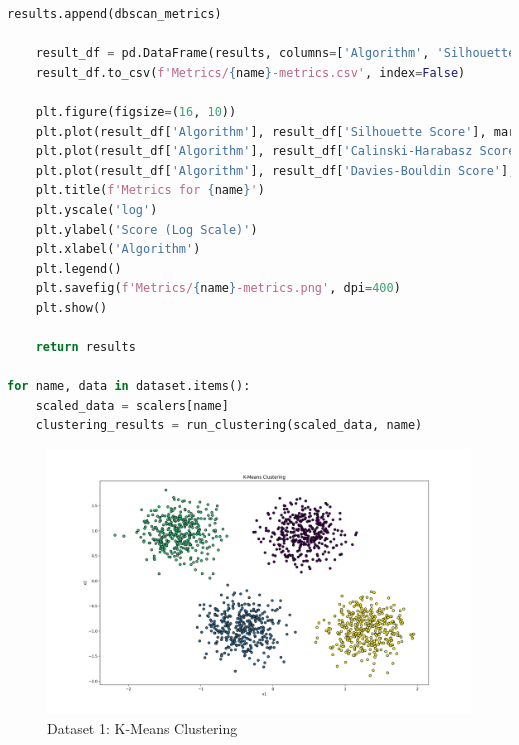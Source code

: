 \begin{lstlisting}[language=Python, caption=Code to Cluster Datasets and generate Metrics]
    results.append(dbscan_metrics)

    result_df = pd.DataFrame(results, columns=['Algorithm', 'Silhouette Score', 'Calinski-Harabasz Score', 'Davies-Bouldin Score'])
    result_df.to_csv(f'Metrics/{name}-metrics.csv', index=False)

    plt.figure(figsize=(16, 10))
    plt.plot(result_df['Algorithm'], result_df['Silhouette Score'], marker='o', label='Silhouette Score')
    plt.plot(result_df['Algorithm'], result_df['Calinski-Harabasz Score'], marker='o', label='Calinski-Harabasz Score')
    plt.plot(result_df['Algorithm'], result_df['Davies-Bouldin Score'], marker='o', label='Davies-Bouldin Score')
    plt.title(f'Metrics for {name}')
    plt.yscale('log')
    plt.ylabel('Score (Log Scale)')
    plt.xlabel('Algorithm')
    plt.legend()
    plt.savefig(f'Metrics/{name}-metrics.png', dpi=400)
    plt.show()

    return results

for name, data in dataset.items():
    scaled_data = scalers[name]
    clustering_results = run_clustering(scaled_data, name)
\end{lstlisting}

\begin{figure}[H]
	\centering
	\includegraphics[width=0.9\linewidth]{Images/Clusters-5-v0-K-Means Clustering.png}
	\caption{Dataset 1: K-Means Clustering}
	\label{fig:clusters-5-v0-k-means-clustering}
\end{figure}

